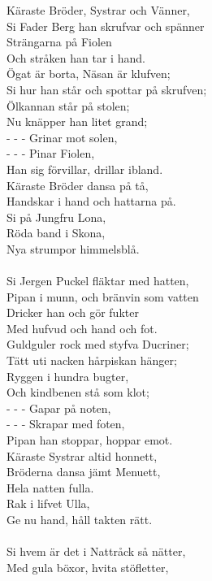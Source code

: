 \vspace{10pt}
Käraste Bröder, Systrar och Vänner,\\
Si Fader Berg han skrufvar och spänner\\
Strängarna på Fiolen\\
Och stråken han tar i hand.\\
Ögat är borta, Näsan är klufven;\\
Si hur han står och spottar på skrufven;\\
Ölkannan står på stolen;\\
Nu knäpper han litet grand;\\
-  -  -  Grinar mot solen,\\
-  -  -  Pinar Fiolen,\\
Han sig förvillar, drillar ibland.\\
Käraste Bröder dansa på tå,\\
Handskar i hand och hattarna på.\\
Si på Jungfru Lona,\\
Röda band i Skona,\\
Nya strumpor himmelsblå.\\
\\
Si Jergen Puckel fläktar med hatten,\\
Pipan i munn, och bränvin som vatten\\
Dricker han och gör fukter\\
Med hufvud och hand och fot.\\
Guldguler rock med styfva Ducriner;\\
Tätt uti nacken hårpiskan hänger;\\
Ryggen i hundra bugter,\\
Och kindbenen stå som klot;\\
-  -  -  Gapar på noten,\\
-  -  -  Skrapar med foten,\\
Pipan han stoppar, hoppar emot.\\
Käraste Systrar altid honnett,\\
Bröderna dansa jämt Menuett,\\
Hela natten fulla.\\
Rak i lifvet Ulla,\\
Ge nu hand, håll takten rätt.\\
\\
Si hvem är det i Nattråck så nätter,\\
Med gula böxor, hvita stöfletter,\\
